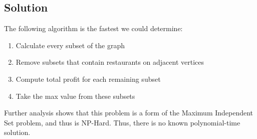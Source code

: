 \subsection*{Solution}

The following algorithm is the fastest we could determine:

\begin{enumerate}
  \item Calculate every subset of the graph
  \item Remove subsets that contain restaurants on adjacent vertices
  \item Compute total profit for each remaining subset
  \item Take the max value from these subsets
\end{enumerate}

Further analysis shows that this problem is a form of the Maximum Independent Set problem, and thus is NP-Hard. Thus, there is no known polynomial-time solution.
